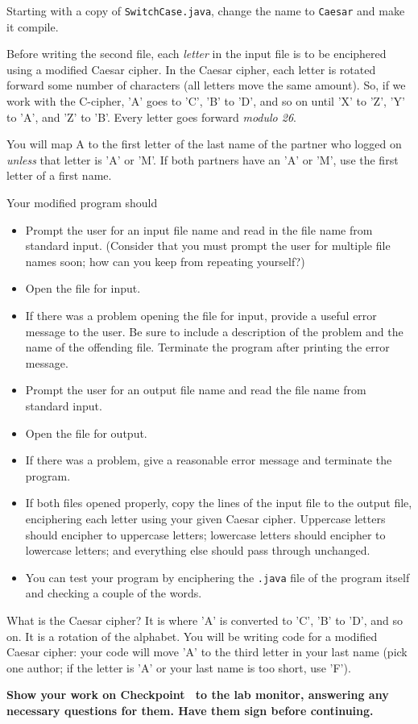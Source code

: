 \documentclass[12pt,oneside]{memoir}
\newcommand\code[1]{\lstinline^#1^}
\newcommand\fname[1]{\texttt{#1}}
\newenvironment{Checkpoint}[1]{%
  \begin{Exercise}[name={Checkpoint},title={#1}]}{%
  \end{Exercise}%
  \textbf{Show your work on Checkpoint~\theExercise{} to the lab monitor, %
    answering any necessary questions for them.  Have them sign before continuing.}}
\begin{document}
\begin{Checkpoint}{Caesar.java}
Starting with a copy of \fname{SwitchCase.java}, change the name to
\code{Caesar} and make it compile.

Before writing the second file, each \emph{letter} in the input file
is to be enciphered using a modified Caesar cipher. In the Caesar
cipher, each letter is rotated forward some number of characters (all
letters move the same amount). So, if we work with the C-cipher, 'A'
goes to 'C', 'B' to 'D', and so on until 'X' to 'Z', 'Y' to 'A', and
'Z' to 'B'. Every letter goes forward \emph{modulo 26}.

You will map A to the first letter of the last name of the partner who
logged on \emph{unless} that letter is 'A' or 'M'. If both partners
have an 'A' or 'M', use the first letter of a first name.

Your modified program should 
\begin{itemize}
\item Prompt the user for an input file name and read in the file name
  from standard input. (Consider that you must prompt the user for
  multiple file names soon; how can you keep from repeating yourself?)
\item Open the file for input.
\item If there was a problem opening the file for input, provide a
  useful error message to the user. Be sure to include a description
  of the problem and the name of the offending file. Terminate the
  program after printing the error message.
\item Prompt the user for an output file name and read the  file name
  from standard input.
\item Open the file for output.
\item If there was a problem, give a reasonable error message and
  terminate the program.
\item If both files opened properly, copy the lines of the input file to
  the output file, enciphering each letter using your given Caesar
  cipher. Uppercase letters should encipher to uppercase letters;
  lowercase letters should encipher to lowercase letters; and
  everything else should pass through unchanged.
\item You can test your program by enciphering the \fname{.java} file of
  the program itself and checking a couple of the words.
\end{itemize}

  What is the Caesar cipher? It is where 'A' is converted to 'C', 'B'
  to 'D', and so on. It is a rotation of the alphabet. You will be
  writing code for a modified Caesar cipher: your code will move 'A'
  to the third letter in your last name (pick one author; if the
  letter is 'A' or your last name is too short, use 'F').


\end{Checkpoint}
\end{document}
